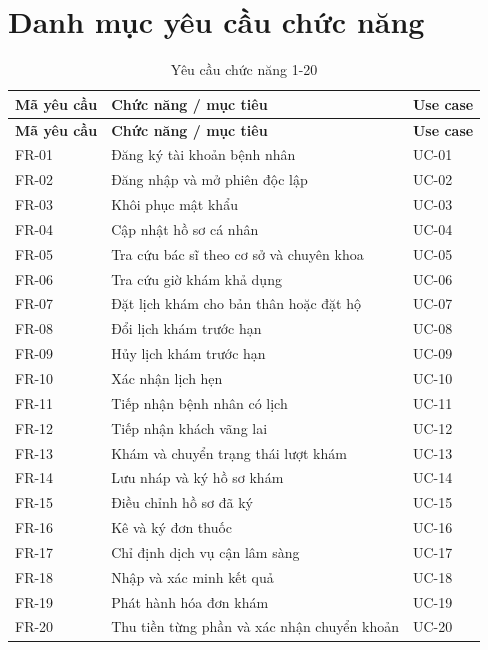\clearpage

\section{Danh mục yêu cầu chức năng}

{\small\setlength{\tabcolsep}{3pt}\renewcommand{\arraystretch}{1.12}
\begin{longtable}{@{}L{\textwidth-1.68pt\relax} L{\textwidth-8.4pt\relax} L{\textwidth-1.92pt\relax}@{}}
\caption{Yêu cầu chức năng 1-20}\\
\toprule
\textbf{Mã yêu cầu} & \textbf{Chức năng /\allowbreak{} mục tiêu} & \textbf{Use case}\\\midrule
\endfirsthead
\toprule
\textbf{Mã yêu cầu} & \textbf{Chức năng /\allowbreak{} mục tiêu} & \textbf{Use case}\\\midrule
\endhead
\bottomrule\endlastfoot
FR-01 & Đăng ký tài khoản bệnh nhân & UC-01\\[3pt]
FR-02 & Đăng nhập và mở phiên độc lập & UC-02\\[3pt]
FR-03 & Khôi phục mật khẩu & UC-03\\[3pt]
FR-04 & Cập nhật hồ sơ cá nhân & UC-04\\[3pt]
FR-05 & Tra cứu bác sĩ theo cơ sở và chuyên khoa & UC-05\\[3pt]
FR-06 & Tra cứu giờ khám khả dụng & UC-06\\[3pt]
FR-07 & Đặt lịch khám cho bản thân hoặc đặt hộ & UC-07\\[3pt]
FR-08 & Đổi lịch khám trước hạn & UC-08\\[3pt]
FR-09 & Hủy lịch khám trước hạn & UC-09\\[3pt]
FR-10 & Xác nhận lịch hẹn & UC-10\\[3pt]
FR-11 & Tiếp nhận bệnh nhân có lịch & UC-11\\[3pt]
FR-12 & Tiếp nhận khách vãng lai & UC-12\\[3pt]
FR-13 & Khám và chuyển trạng thái lượt khám & UC-13\\[3pt]
FR-14 & Lưu nháp và ký hồ sơ khám & UC-14\\[3pt]
FR-15 & Điều chỉnh hồ sơ đã ký & UC-15\\[3pt]
FR-16 & Kê và ký đơn thuốc & UC-16\\[3pt]
FR-17 & Chỉ định dịch vụ cận lâm sàng & UC-17\\[3pt]
FR-18 & Nhập và xác minh kết quả & UC-18\\[3pt]
FR-19 & Phát hành hóa đơn khám & UC-19\\[3pt]
FR-20 & Thu tiền từng phần và xác nhận chuyển khoản & UC-20\\[3pt]
\end{longtable}}
\clearpage

